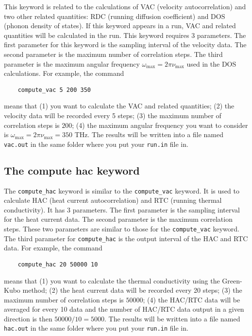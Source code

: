 \documentclass[12pt,a4paper]{report}
\begin{document}
This keyword is related to the calculations of VAC (velocity autocorrelation) and two other related quantities: RDC (running diffusion coefficient) and DOS (phonon density of states).
If this keyword appears in a run, VAC and related quantities will be calculated in the run. This keyword requires 3 parameters.
The first parameter for this keyword is the sampling interval of the velocity data. The second parameter is the maximum number of correlation steps. The third parameter is the maximum angular frequency $\omega_{\text{max}}=2\pi \nu_{\text{max}}$ used in the DOS calculations. For example, the command
\begin{verbatim}
    compute_vac 5 200 350
\end{verbatim}
means that (1) you want to calculate the VAC and related quantities; (2) the velocity data will be recorded every 5 steps; (3) the maximum number of correlation steps is $200$; (4) the maximum angular frequency you want to consider is $\omega_{\text{max}}=2\pi \nu_{\text{max}}= 350$ THz. The results will be written into a file named \verb"vac.out" in the same folder where you put your \verb"run.in" file in.


\subsection{The compute hac keyword}

The \verb"compute_hac" keyword is similar to the \verb"compute_vac" keyword. It is used to calculate HAC (heat current autocorrelation) and RTC (running thermal conductivity).
It has 3 parameters. The first parameter is the sampling interval for the heat current data. The second parameter is the maximum correlation steps. These two parameters are similar to those for the \verb"compute_vac" keyword. The third parameter for \verb"compute_hac" is the output interval of the HAC and RTC data. For example, the command
\begin{verbatim}
    compute_hac 20 50000 10
\end{verbatim}
means that (1) you want to calculate the thermal conductivity using the Green-Kubo method; (2) the heat current data will be recorded every 20 steps; (3) the maximum number of correlation steps is $50000$; (4) the HAC/RTC data will be averaged for every 10 data and the number of HAC/RTC data output in a given direction is then $50000/10=5000$. The results will be written into a file named \verb"hac.out" in the same folder where you put your \verb"run.in" file in.
\end{document}
